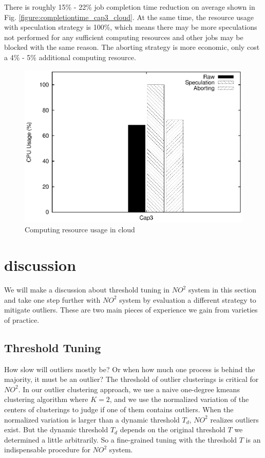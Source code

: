 There is roughly 15\% - 22\% job completion time reduction on average shown in Fig.
\ref{figure:completiontime_cap3_cloud}. At the same time, the resource usage with
speculation strategy is 100\%, which means there may be more speculations not performed
for any sufficient computing resources and other jobs may be blocked with the same reason.
The aborting strategy is more economic, only cost a 4\% - 5\% additional computing
resource.

\begin{figure}
\centering
\includegraphics[width=0.9\columnwidth]{figures/cloud_resource_usage.eps}
\caption{Computing resource usage in cloud}
\label{figure:resourceusage_cloud}
\end{figure}

\section{discussion}

We will make a discussion about threshold tuning in $NO^2$ system in this section and take
one step further with $NO^2$ system by evaluation a different strategy to mitigate
outliers. These are two main pieces of experience we gain from varieties of practice.

\subsection{Threshold Tuning}

How slow will outliers mostly be? Or when how much one process is behind the majority, it
must be an outlier? The threshold of outlier clusterings is critical for $NO^2$. In our
outlier clustering approach, we use a naive one-degree kmeans clustering algorithm where
$K = 2$, and we use the normalized variation of the centers of clusterings to judge if one
of them contains outliers. When the normalized variation is larger than a dynamic
threshold $T_d$, $NO^2$ realizes outliers exist. But the dynamic threshold $T_d$ depends
on the original threshold $T$ we determined a little arbitrarily. So a fine-grained tuning
with the threshold $T$ is an indispensable procedure for $NO^2$ system.

